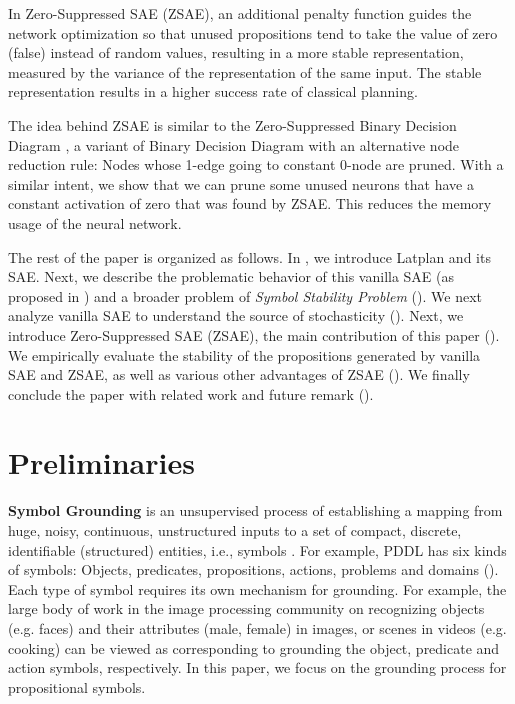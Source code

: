 In Zero-Suppressed SAE (ZSAE), an additional penalty function
guides the network optimization so that unused propositions tend to 
take the value of zero (false) instead of random values,
resulting in a more stable representation, measured by the variance of the representation of the same input.
The stable representation results in a higher success rate of classical planning.

The idea behind ZSAE is similar to the Zero-Suppressed Binary Decision Diagram \cite{minato1993zero},
a variant of Binary Decision Diagram \cite{bryant1986graph} with an alternative node reduction rule:
Nodes whose 1-edge going to constant 0-node are pruned.
With a similar intent, we show that we can prune some unused neurons
that have a constant activation of zero that was found by ZSAE.
This reduces the memory usage of the neural network.

The rest of the paper is organized as follows.
In , we introduce Latplan \cite{Asai2018} and its SAE.
Next, we describe the problematic behavior of this vanilla SAE (as proposed in \cite{Asai2018}) and
a broader problem of \emph{Symbol Stability Problem} ().
We next analyze vanilla SAE to understand the source of stochasticity ().
Next, we introduce Zero-Suppressed SAE (ZSAE), the main contribution of this paper ().
We empirically evaluate the stability of the propositions generated by vanilla SAE and ZSAE,
as well as various other advantages of ZSAE ().
We finally conclude the paper with related work and future remark ().


\section{Preliminaries}
\label{background}

\textbf{Symbol Grounding} is an unsupervised process of establishing a mapping
from huge, noisy, continuous, unstructured inputs
to a set of compact, %
discrete, identifiable (structured) entities, i.e., symbols \cite{Asai2018}.
For example, PDDL has six kinds of symbols: Objects, predicates, propositions, actions, problems and domains ().
Each type of symbol requires its own mechanism for grounding.
For example, the large body of work in the image processing community on recognizing 
objects (e.g. faces) and their attributes (male, female) in images, or scenes in videos (e.g. cooking)
can be viewed as corresponding to grounding the object, predicate and action symbols, respectively.
In this paper, we focus on the grounding process for propositional symbols.

